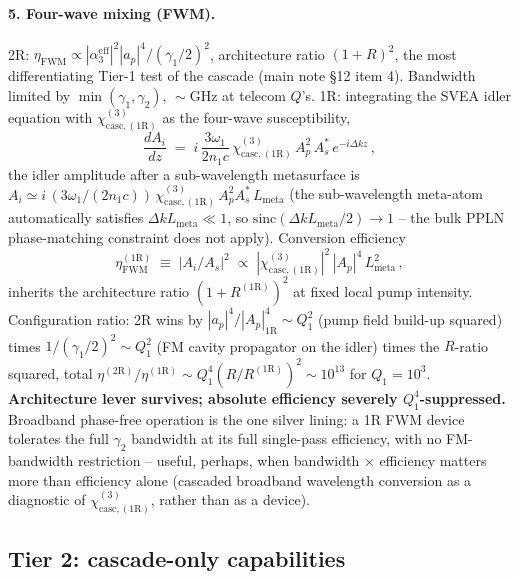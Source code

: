 \documentclass[11pt,a4paper]{article}
\newcommand{\chicascOneR}{\chi^{(3)}_{\text{casc},(1\mathrm R)}}
\begin{document}
\paragraph{5. Four-wave mixing (FWM).}
2R: $\eta_\text{FWM}\propto|\alpha_3^\text{eff}|^{2}|a_p|^{4}/(\gamma_1/2)^{2}$,
architecture ratio $(1+R)^{2}$, the most differentiating Tier-1
test of the cascade (main note \S 12 item 4).  Bandwidth limited by
$\min(\gamma_1,\gamma_2)$, $\!\sim\!$GHz at telecom $Q$'s.
1R: integrating the SVEA idler equation with $\chicascOneR$ as the
four-wave susceptibility,
\begin{equation}
  \frac{dA_i}{dz}\;=\;i\,\frac{3\omega_1}{2 n_1 c}\,
        \chicascOneR\,A_p^{2}\,A_s^{*}\,e^{-i\Delta k z}\,,
  \label{eq:FWM-1R-SVEA}
\end{equation}
the idler amplitude after a sub-wavelength metasurface is
$A_i\simeq i\,(3\omega_1/(2 n_1 c))\,\chicascOneR\,A_p^{2}A_s^{*}\,L_\text{meta}$
(the sub-wavelength meta-atom automatically satisfies $\Delta k L_\text{meta}\!\ll\!1$,
so $\mathrm{sinc}(\Delta k L_\text{meta}/2)\to 1$ -- the bulk PPLN
phase-matching constraint does not apply).  Conversion efficiency
\begin{equation}
  \eta_\text{FWM}^{(1\mathrm R)}\;\equiv\;\bigl|A_i/A_s\bigr|^{2}
   \;\propto\;|\chicascOneR|^{2}\,|A_p|^{4}\,L_\text{meta}^{2}\,,
\end{equation}
inherits the architecture ratio $(1+R^{(1\mathrm R)})^{2}$ at fixed local
pump intensity.  Configuration ratio: 2R wins by $|a_p|^{4}/|A_p|^{4}_\text{1R}\sim Q_1^{2}$
(pump field build-up squared) times $1/(\gamma_1/2)^{2}\sim Q_1^{2}$
(FM cavity propagator on the idler) times the $R$-ratio squared, total
$\eta^{(2\mathrm R)}/\eta^{(1\mathrm R)}\sim Q_1^{4}(R/R^{(1\mathrm R)})^{2}\sim 10^{13}$
for $Q_1\!=\!10^{3}$.
\textbf{Architecture lever survives; absolute efficiency severely
$Q_1^{4}$-suppressed.}  Broadband phase-free operation is the one
silver lining: a 1R FWM device tolerates the full $\gamma_2$ bandwidth at
its full single-pass efficiency, with no FM-bandwidth restriction --
useful, perhaps, when bandwidth $\times$ efficiency matters more than
efficiency alone (cascaded broadband wavelength conversion as a
diagnostic of $\chicascOneR$, rather than as a device).

\subsection*{Tier 2: cascade-only capabilities}
\end{document}
